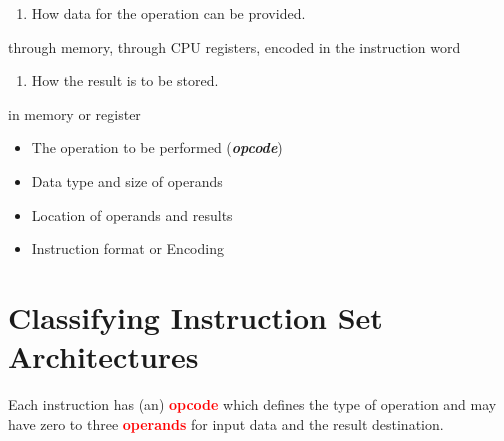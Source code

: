 \documentclass[
  16pt,
  a4paper,
]{report}
\providecommand{\tightlist}{%
  \setlength{\itemsep}{0pt}\setlength{\parskip}{0pt}}\usepackage{longtable,booktabs,array}
\begin{document}
\begin{enumerate}
\def\labelenumi{\arabic{enumi}.}
\setcounter{enumi}{1}
\tightlist
\item
  How data for the operation can be provided.
\end{enumerate}

\begin{tcolorbox}[colback=boxbodycol, colframe=boxbodycol]
through memory, through CPU registers, encoded in the instruction word

\end{tcolorbox}

\begin{enumerate}
\def\labelenumi{\arabic{enumi}.}
\setcounter{enumi}{2}
\tightlist
\item
  How the result is to be stored.
\end{enumerate}

\begin{tcolorbox}[colback=boxbodycol, colframe=boxbodycol]
in memory or register

\end{tcolorbox}

\begin{tcolorbox}[colback=boxbodycol, colframe=boxheadcol, title=\textcolor{red}{\textbf{Therefore, the ISA must define:}}, coltitle=boxtitlecol, colbacktitle=boxheadcol]

\begin{itemize}
\tightlist
\item
  The operation to be performed (\textbf{\emph{opcode}})
\item
  Data type and size of operands
\item
  Location of operands and results
\item
  Instruction format or Encoding
\end{itemize}

\end{tcolorbox}

\newpage{}

\section{Classifying Instruction Set
Architectures}\label{classifying-instruction-set-architectures}

Each instruction has (an) \textcolor{red}{\textbf{opcode}} which defines
the type of operation and may have zero to three
\textcolor{red}{\textbf{operands}} for input data and the result
destination.
\end{document}

